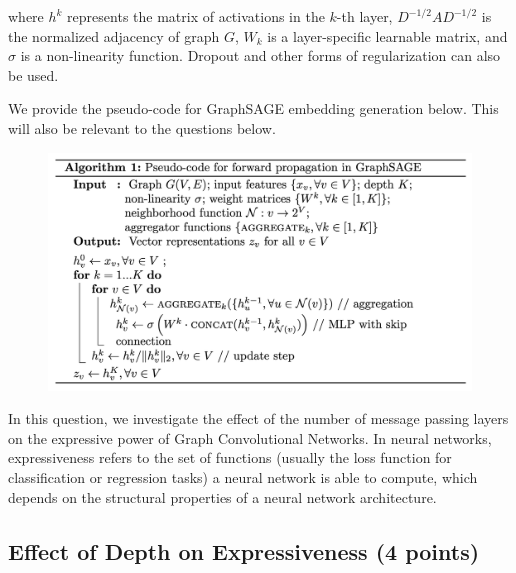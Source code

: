 \documentclass{article}
\numberwithin{figure}{section}
\begin{document}
where $h^k$ represents the matrix of activations in the $k$-th layer, $D^{-1/2}AD^{-1/2}$ is the normalized adjacency of graph $G$, $W_k$ is a layer-specific learnable matrix, and $\sigma$ is a non-linearity function. Dropout and other forms of regularization can also be used.

We provide the pseudo-code for GraphSAGE embedding generation below. This will also be relevant to the questions below.

\begin{figure}[H]
\centering
  \includegraphics[width=1\columnwidth]{CS224W_Homework1/algorithm.png}
\end{figure}

In this question, we investigate the effect of the number of message passing layers on the expressive power of Graph Convolutional Networks. In neural networks, expressiveness refers to the set of functions (usually the loss function for classification or regression tasks) a neural network is able to compute, which depends on the structural properties of a neural network architecture.

\subsection{Effect of Depth on Expressiveness (4 points)}
\end{document}
